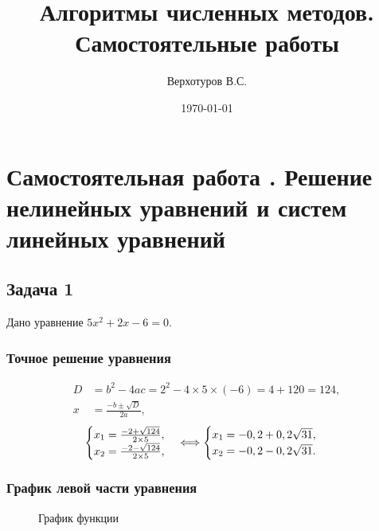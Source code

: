 \documentclass[10pt, a4paper, titlepage]{article}
\title{Алгоритмы численных методов. \\ Самостоятельные работы}
\author{Верхотуров В.С.}
\affil{БСБО-05-20}
\affil{РТУ МИРЭА}
\date\today
\begin{document}
\maketitle
\tableofcontents
\newpage

\section{Самостоятельная работа . Решение нелинейных уравнений и систем линейных уравнений}

\subsection{Задача 1}

Дано уравнение $5x^2+2x-6=0$.

\subsubsection*{Точное решение уравнения}

\begin{align*}
D &= b^2-4ac=2^2-4\times5\times(-6)=4+120=124, \\
x &= \frac{-b\pm\sqrt{D}}{2a},
\end{align*}
\begin{equation*}
    \begin{cases}
        $$x_1=\frac{-2+\sqrt{124}}{2\times5}$$, \\
        $$x_2=\frac{-2-\sqrt{124}}{2\times5}$$,
    \end{cases}
    \Longleftrightarrow
    \begin{cases}
        $$x_1=-0,2+0,2\sqrt{31}$$, \\
        $$x_2=-0,2-0,2\sqrt{31}$$.
    \end{cases}
\end{equation*} 

\subsubsection*{График левой части уравнения}
\begin{figure}[H]
    \centering
    \caption{График функции}
    \label{sr1Task1Function}
\end{figure}
\end{document}
